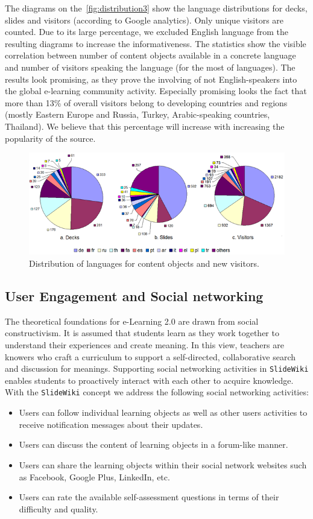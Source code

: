\documentclass[PhD, Submit, ngerman,UKenglish,table]{scrbook}
\begin{document}
The diagrams on the~\autoref{fig:distribution3} show the language distributions for decks, slides and visitors (according to Google analytics).
Only unique visitors are counted.
Due to its large percentage, we excluded English language from the resulting diagrams to increase the informativeness. 
The statistics show the visible correlation between number of content objects available in a concrete language and number of visitors speaking the language (for the most of languages).
The results look promising, as they prove the involving of not English-speakers into the global e-learning community activity.
Especially promising looks the fact that more than 13\% of overall visitors belong to developing countries and regions (mostly Eastern Europe and Russia, Turkey, Arabic-speaking countries, Thailand).
We believe that this percentage will increase with increasing the popularity of the source.

\begin{figure}[!ht]
\centering
\includegraphics[width=1\textwidth]{Images/languages+visitors.png}
\caption{Distribution of languages for content objects and new visitors.}
\label{fig:distribution3}
\end{figure}

 
\subsection{User Engagement and Social networking}
The theoretical foundations for e-Learning 2.0 are drawn from social constructivism.
It is assumed that students learn as they work together to understand their experiences and create meaning.
In this view, teachers are knowers who craft a curriculum to support a self-directed, collaborative search and discussion for meanings.
Supporting social networking activities in \texttt{SlideWiki} enables students to proactively interact with each other to acquire knowledge.
With the \texttt{SlideWiki} concept we address the following social networking activities:
\begin{itemize}
\item Users can follow individual learning objects as well as other users activities to receive notification messages about their updates.
\item Users can discuss the content of learning objects in a forum-like manner.
\item Users can share the learning objects within their social network websites such as Facebook, Google Plus, LinkedIn, etc.
\item Users can rate the available self-assessment questions in terms of their difficulty and quality.
\end{itemize}
\end{document}
